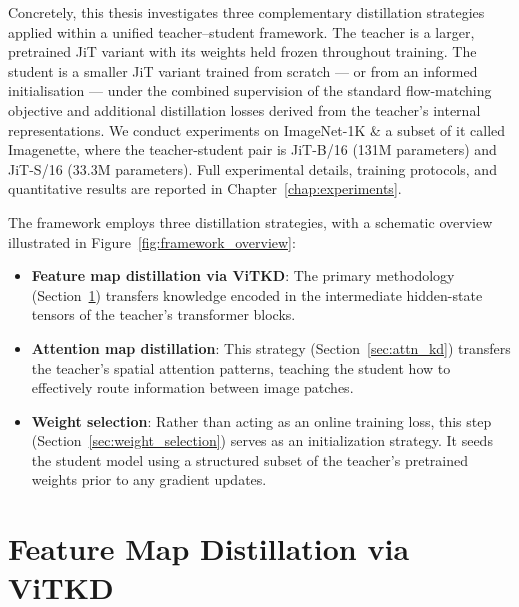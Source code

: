 Concretely, this thesis investigates three complementary distillation strategies applied within a unified teacher--student framework. The teacher is a larger, pretrained JiT variant with its weights held frozen throughout training. The student is a smaller JiT variant trained from scratch — or from an informed initialisation — under the combined supervision of the standard flow-matching objective and additional distillation losses derived from the teacher's internal representations. We conduct experiments on ImageNet-1K \cite{russakovsky2015imagenet} & a subset of it called Imagenette, where the teacher-student pair is JiT-B/16 (131M parameters) and JiT-S/16 (33.3M parameters). Full experimental details, training protocols, and quantitative results are reported in Chapter~\ref{chap:experiments}.

The framework employs three distillation strategies, with a schematic overview illustrated in Figure~\ref{fig:framework_overview}:
\begin{itemize}
    \item \textbf{Feature map distillation via ViTKD}: The primary methodology (Section~\ref{sec:vitkd}) transfers knowledge encoded in the intermediate hidden-state tensors of the teacher's transformer blocks.
    
    \item \textbf{Attention map distillation}: This strategy (Section~\ref{sec:attn_kd}) transfers the teacher's spatial attention patterns, teaching the student how to effectively route information between image patches.
    
    \item \textbf{Weight selection}: Rather than acting as an online training loss, this step (Section~\ref{sec:weight_selection}) serves as an initialization strategy. It seeds the student model using a structured subset of the teacher's pretrained weights prior to any gradient updates.
\end{itemize}

\section{Feature Map Distillation via ViTKD}
\label{sec:vitkd}

